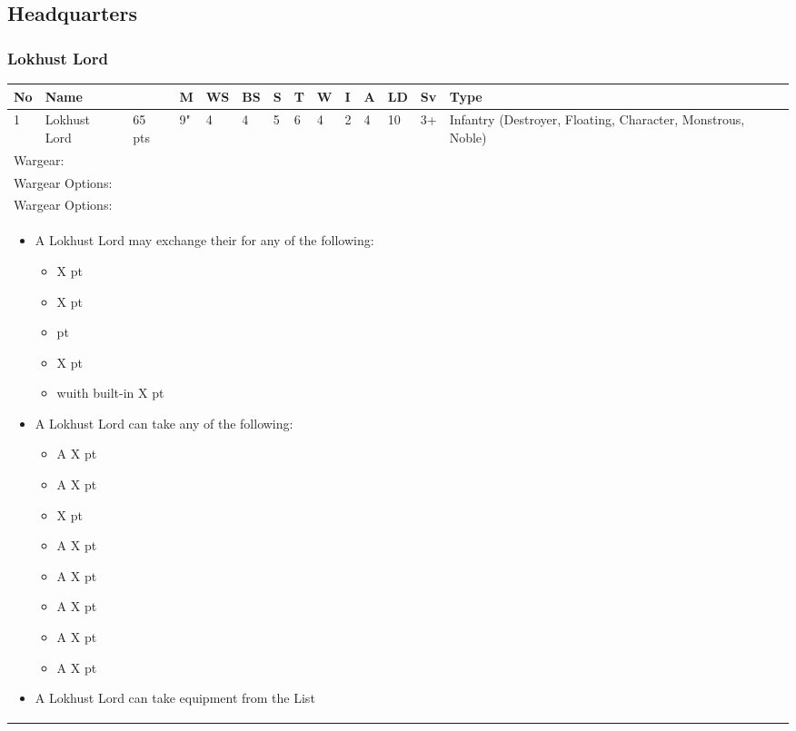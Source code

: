 \newpage
\subsection{Headquarters}

\subsubsection{Lokhust Lord}

\noindent
\begin{tabular}{||m{10pt} m{95pt} m{30pt} m{11pt} m{11pt} m{11pt} m{11pt} m{11pt} m{11pt} m{11pt} m{11pt} m{11pt} m{11pt} m{125pt}||}
	\hline
	No & Name & & M & WS & BS & S & T & W & I & A & LD & Sv & Type \\
	\hline
	1 & Lokhust Lord & 65 pts & 9" & 4 & 4 & 5 & 6 & 4 & 2 & 4 & 10 & 3+ & Infantry (Destroyer, Floating, Character, Monstrous, Noble)\\
	\hline
	\hline
	\multicolumn{14}{||Z{532 pt}||}{Wargear: \quickref{Staff of Light}}\\
	\multicolumn{14}{||Z{532 pt}||}{Wargear Options:} \\
	\multicolumn{14}{||Z{532 pt}||}{Wargear Options:} \\	
	\multicolumn{14}{||Z{532 pt}||}{\begin{itemize}
			\item A Lokhust Lord may exchange their \quickref{Staff of Light} for any of the following:
			\begin{itemize}
				\item \quickref{Hyperphase Sword} \hrulefill X pt
				\item \quickref{Rod of Night} \hrulefill X pt
				\item \quickref{Voidblade} \hrulefill 0 pt
				\item \quickref{Warscythe} \hrulefill X pt
				\item \quickref{Warscythe} wuith built-in \quickref{Relic Gauss Blaster} \hrulefill X pt
			\end{itemize}
			\item A Lokhust Lord can take any of the following:
			\begin{itemize}
				\item A \quickref{Gauntlet of Fire} \hrulefill X pt
				\item A \quickref{Tachyon Arrow} \hrulefill X pt
				\item \quickref{Mindshackle Scarabs} \hrulefill X pt
				\item A \quickref{Phase Shifter} \hrulefill X pt
				\item A \quickref{Phylactery} \hrulefill X pt
				\item A \quickref{Resurrection Orb} \hrulefill X pt
				\item A \quickref{Sempiternal Weave} \hrulefill X pt
				\item A \quickref{Tesseract Labyrinth} \hrulefill X pt
			\end{itemize}
			\item A Lokhust Lord can take equipment from the \quickref{Artefacts of the Aeons} List
	\end{itemize}} \\		
\end{tabular}


